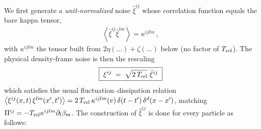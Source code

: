 \documentclass[12pt,aps,preprint,nofootinbib,noshowkeys,noshowpacs,longbibliography,superscriptaddress,tightenlines]{revtex4-2}
\def\llangle{\left\langle}
\def\rrangle{\right\rangle}
\begin{document}
We first generate a \emph{unit-normalized} noise $\hat\xi^{ij}$ whose correlation
function equals the bare kappa tensor,
\begin{align}
\label{eq:xihat_cov}
 \llangle \hat\xi^{ij} \hat\xi^{lm} \rrangle = \kappa^{ijlm} \, ,
\end{align}
with $\kappa^{ijlm}$ the tensor built from $2\eta(\dots)+\zeta(\dots)$ below
(no factor of $T_{\rm rel}$).  The physical density-frame noise is then the
rescaling
\begin{align}
\label{eq:xi_from_xihat}
 \boxed{\;\xi^{ij} \;=\; \sqrt{2\,T_{\rm rel}}\;\hat\xi^{ij}\;}
\end{align}
which satisfies the usual fluctuation--dissipation relation
$\llangle \xi^{ij}(x,t)\,\xi^{lm}(x',t')\rrangle = 2\,T_{\rm rel}\,\kappa^{ijlm}(v)\,
\delta(t-t')\,\delta^d(x-x')$, matching $\Pi^{ij} = -T_{\rm rel}\kappa^{ijlm}\partial_l\beta_m$.
The construction of $\hat\xi^{ij}$ is done for every particle as follows:
\end{document}
